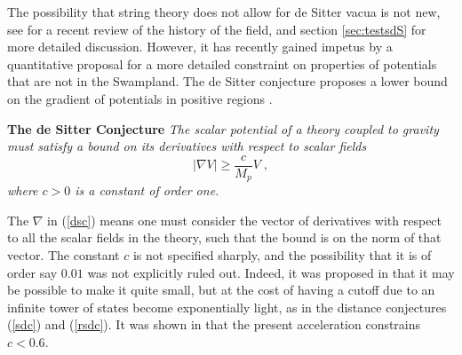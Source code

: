 \documentclass[11pt,a4paper]{article}
\numberwithin{equation}{section}
\numberwithin{table}{section}\setlength{\multlinegap}{25pt}
\begin{document}
{The possibility that string theory does not allow for de Sitter vacua is not new, see \cite{Danielsson:2018ztv} for a recent review of the history of the field, and section \ref{sec:testsdS} for more detailed discussion. However, it has recently gained impetus by a quantitative proposal for a more detailed constraint on properties of potentials that are not in the Swampland. The de Sitter conjecture proposes a lower bound on the gradient of potentials in positive regions \cite{Obied:2018sgi}.  
\begin{tcolorbox}
{\bf The de Sitter Conjecture} \;\cite{Obied:2018sgi}
{\it 
\newline
\newline
The scalar potential of a theory coupled to gravity must satisfy a bound on its derivatives with respect to scalar fields
\begin{equation}
\label{dsc}
\left|\nabla V \right| \geq \frac{c}{M_p} V\;,
\end{equation}
where $c>0$ is a constant of order one. 
}
\end{tcolorbox}
The $\nabla$ in (\ref{dsc}) means one must consider the vector of derivatives with respect to all the scalar fields in the theory, such that the bound is on the norm of that vector. The constant $c$ is not specified sharply, and the possibility that it is of order say $0.01$ was not explicitly ruled out. Indeed, it was proposed in \cite{Obied:2018sgi} that it may be possible to make it quite small, but at the cost of having a cutoff due to an infinite tower of states become exponentially light, as in the distance conjectures (\ref{sdc}) and (\ref{rsdc}). It was shown in \cite{Agrawal:2018own} that the present acceleration constrains $c < 0.6$.

}
\end{document}
